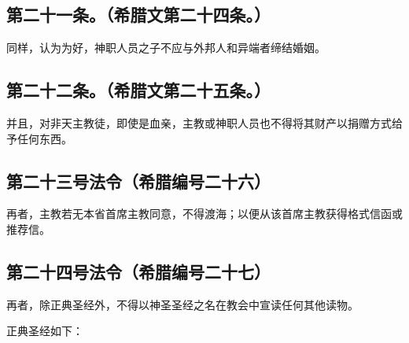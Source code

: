 \subsection{第二十一条。（希腊文第二十四条。）}

\par

同样，认为为好，神职人员之子不应与外邦人和异端者缔结婚姻。\par


\subsection{第二十二条。（希腊文第二十五条。）}

\par

并且，对非天主教徒，即使是血亲，主教或神职人员也不得将其财产以捐赠方式给予任何东西。\par


\subsection{第二十三号法令（希腊编号二十六）}

\par

再者，主教若无本省首席主教同意，不得渡海；以便从该首席主教获得格式信函或推荐信。\par


\subsection{第二十四号法令（希腊编号二十七）}

\par

再者，除正典圣经外，不得以神圣圣经之名在教会中宣读任何其他读物。\par

正典圣经如下：\par


